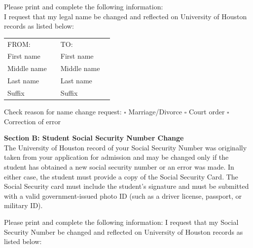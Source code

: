 \documentclass[12pt]{article}
\begin{document}
\vspace{1em}
\noindent Please print and complete the following information:\\
I request that my legal name be changed and reflected on University of Houston records as listed below:

\vspace{0.5em}
\noindent\begin{tabular}{@{}p{}p{}|p{}p{}@{}}
FROM: & & TO: & \\
First name & \underline{\hspace{4cm}} & First name & \underline{\hspace{4cm}} \\
Middle name & \underline{\hspace{4cm}} & Middle name & \underline{\hspace{4cm}} \\
Last name & \underline{\hspace{4cm}} & Last name & \underline{\hspace{4cm}} \\
Suffix & \underline{\hspace{4cm}} & Suffix & \underline{\hspace{4cm}} \\
\end{tabular}

\vspace{1em}
\noindent Check reason for name change request: $\square$ Marriage/Divorce \hspace{1cm} $\square$ Court order \hspace{1cm} $\square$ Correction of error

\vspace{1em}
\noindent\textbf{Section B: Student Social Security Number Change}\\
The University of Houston record of your Social Security Number was originally taken from your application for admission and may be changed only if the student has obtained a new social security number or an error was made. In either case, the student must provide a copy of the Social Security Card. The Social Security card must include the student's signature and must be submitted with a valid government-issued photo ID (such as a driver license, passport, or military ID).

\vspace{1em}
\noindent Please print and complete the following information: I request that my Social Security Number be changed and reflected on University of Houston records as listed below:
\end{document}
